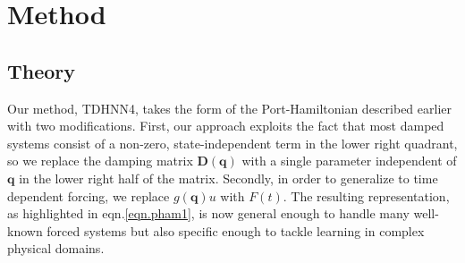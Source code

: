\documentclass[twoside]{article}
\begin{document}
\section{Method}

\subsection*{Theory}
Our method, TDHNN4, takes the form of the Port-Hamiltonian described earlier with two modifications. First, our approach exploits the fact that most damped systems consist of a non-zero, state-independent term in the lower right quadrant, so we replace the damping matrix $\mathbf{D}(\mathbf{q})$ with a single parameter independent of $\mathbf{q}$ in the lower right half of the matrix. Secondly, in order to generalize to time dependent forcing, we replace $g(\mathbf{q})u$ with $F(t)$. The resulting representation, as highlighted in eqn.\ref{eqn.pham1}, is now general enough to handle many well-known forced systems but also specific enough to tackle learning in complex physical domains.
\end{document}
